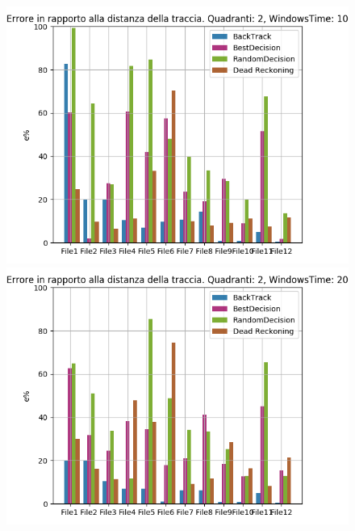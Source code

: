 \documentclass[12pt,a4paper,openright,twoside]{report}
\begin{document}
\begin{figure}[H]
\centering  
\includegraphics[scale=0.4]{firstChart2-10} 
\includegraphics[scale=0.4]{firstChart2-20} 
\end{figure}
\end{document}
